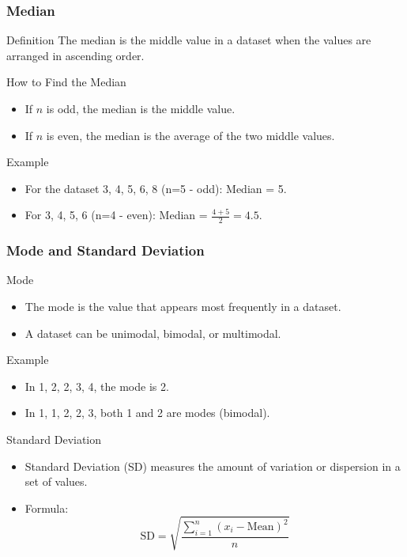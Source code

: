 \documentclass[aspectratio=169]{beamer}
\begin{document}
\begin{frame}[fragile]
    \frametitle{Median}
    \begin{block}{Definition}
        The median is the middle value in a dataset when the values are arranged in ascending order.
    \end{block}
    \begin{block}{How to Find the Median}
        \begin{itemize}
            \item If \( n \) is odd, the median is the middle value.
            \item If \( n \) is even, the median is the average of the two middle values.
        \end{itemize}
    \end{block}
    \begin{block}{Example}
        \begin{itemize}
            \item For the dataset {3, 4, 5, 6, 8} (n=5 - odd): Median = 5.
            \item For {3, 4, 5, 6} (n=4 - even): Median = \(\frac{4 + 5}{2} = 4.5\).
        \end{itemize}
    \end{block}
\end{frame}

\begin{frame}[fragile]
    \frametitle{Mode and Standard Deviation}
    \begin{block}{Mode}
        \begin{itemize}
            \item The mode is the value that appears most frequently in a dataset.
            \item A dataset can be unimodal, bimodal, or multimodal.
        \end{itemize}
        \begin{block}{Example}
            \begin{itemize}
                \item In {1, 2, 2, 3, 4}, the mode is 2.
                \item In {1, 1, 2, 2, 3}, both 1 and 2 are modes (bimodal).
            \end{itemize}
        \end{block}
    \end{block}
    
    \begin{block}{Standard Deviation}
        \begin{itemize}
            \item Standard Deviation (SD) measures the amount of variation or dispersion in a set of values.
            \item Formula:
            \[
            \text{SD} = \sqrt{\frac{\sum_{i=1}^{n} (x_i - \text{Mean})^2}{n}}
            \]
        \end{itemize}
    \end{block}
\end{frame}
\end{document}
